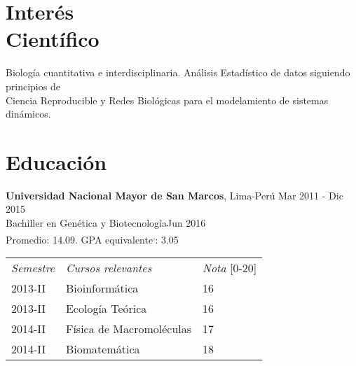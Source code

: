 \documentclass[margin,line]{res}
\begin{document}
	
	\address{Calle Tambo Huascar 201, San Miguel, Lima-Perú}
	\address{\textit{contacto:} avallecam@gmail.com o (+51)950951722}
	
	\begin{resume}
		
		\vspace*{.15in}
		
		\section{\sc Interés \\Científico}
		
		
		Biología cuantitativa e interdisciplinaria. Análisis Estadístico de datos siguiendo principios de\\ Ciencia Reproducible y Redes Biológicas para el modelamiento de sistemas dinámicos.\\%
		
		\section{\sc Educación}
		{\bf Universidad Nacional Mayor de San Marcos}, Lima-Perú \hfill Mar 2011 - Dic 2015\\
		Bachiller en Genética y Biotecnología\hfill Jun 2016\\
		Promedio: 14.09. GPA equivalente\footnotemark\textsuperscript{,}\footnotemark: 3.05\\%
		
		\begin{center}
			\vspace{-9mm}
			\begin{tabular}{lll}
				\textit{Semestre} & \textit{Cursos relevantes} & \textit{Nota} [0-20] \\
				2013-II & Bioinformática & 16\\
				2013-II & Ecología Teórica & 16\\
				2014-II & Física de Macromoléculas & 17\\
				2014-II & Biomatemática & 18\\
			\end{tabular}
			\vspace{4mm}
		\end{center}
		

\end{resume}
\end{document}
